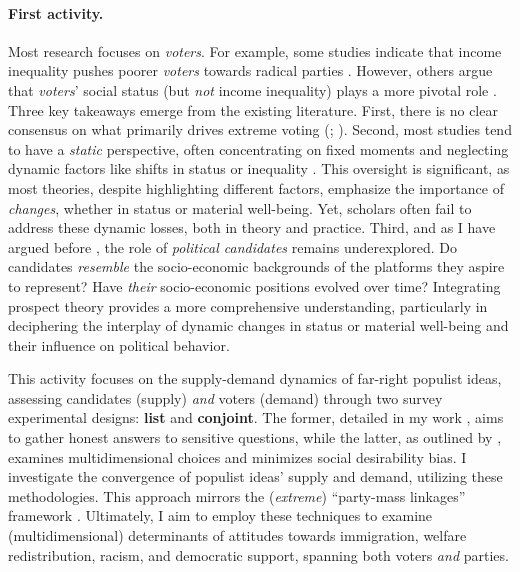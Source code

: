 \documentclass[letterpaper]{article}
\begin{document}
\vspace{-3mm}\paragraph{First activity.} Most research focuses on \emph{voters}. For example, some studies indicate that income inequality pushes poorer \emph{voters} towards radical parties \parencite{Han2016b}. However, others argue that \emph{voters}' social status (but \emph{not} income inequality) plays a more pivotal role \parencite{Gidron2017a,Oesch2008a}. Three key takeaways emerge from the existing literature. First, there is no clear consensus on what primarily drives extreme voting (\cite[p. 3]{Ivarsflaten2008}; \cite[p. 279]{Jesuit2009}). Second, most studies tend to have a \emph{static} perspective, often concentrating on fixed moments and neglecting dynamic factors like shifts in status or inequality \parencite{Kurer2019}. This oversight is significant, as most theories, despite highlighting different factors, emphasize the importance of \emph{changes}, whether in status or material well-being. Yet, scholars often fail to address these dynamic losses, both in theory and practice. Third, and as I have argued before \parencite{Bahamonde2020a}, the role of \emph{political candidates} remains underexplored. Do candidates \emph{resemble} the socio-economic backgrounds of the platforms they aspire to represent? Have \emph{their} socio-economic positions evolved over time? Integrating prospect theory provides a more comprehensive understanding, particularly in deciphering the interplay of dynamic changes \parencite[p. 643]{Thaler1990} in status or material well-being and their influence on political behavior.

\vspace{2mm}This activity focuses on the supply-demand dynamics of far-right populist ideas, assessing candidates (supply) \emph{and} voters (demand) through two survey experimental designs: {\bf list} and {\bf conjoint}. The former, detailed in my work \parencite{Bahamonde2020a}, aims to gather honest answers to sensitive questions, while the latter, as outlined by \textcite{Hainmueller2014}, examines multidimensional choices and minimizes social desirability bias. I investigate the convergence of populist ideas' supply and demand, utilizing these methodologies. This approach mirrors the (\emph{extreme}) ``party-mass linkages'' framework \parencite{Kitschelt2000}. Ultimately, I aim to employ these techniques to examine (multidimensional) determinants of attitudes towards immigration, welfare redistribution, racism, and democratic support, spanning both voters \emph{and} parties.  
\end{document}
